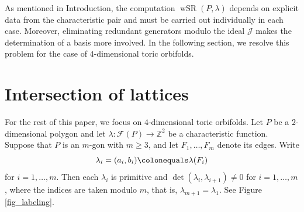 \documentclass[10pt]{amsart}
\theoremstyle{plain}
\theoremstyle{definition}
\numberwithin{equation}{section}
\newcommand{\ZZ}{\mathbb{Z}}
\DeclareMathOperator{\wSR}{wSR}
\begin{document}
As mentioned in Introduction, the computation $\wSR(P, \lambda)$ depends on explicit data from the characteristic pair and must be carried out individually in each case. Moreover, eliminating redundant generators modulo the ideal $\mathcal{J}$ makes the determination of a basis more involved. In the following section, we resolve this problem for the case of $4$-dimensional toric orbifolds. 






\section{Intersection of lattices}\label{sec_lat_int}
For the rest of this paper, we focus on $4$-dimensional toric orbifolds. Let $P$ be a $2$-dimensional polygon and let $\lambda\colon \mathcal{F}(P) \to \ZZ^2$ be a characteristic function. Suppose that $P$ is an $m$-gon with $m\geq 3$, and let $F_1, \dots, F_m$ denote its edges. Write
\[
\lambda_i=(a_i, b_i)\colonequals\lambda(F_i)
\] for $i=1, \dots, m$. Then each $\lambda_i$ is primitive and $\det(\lambda_i,\lambda_{i+1})\neq 0$ for $i=1, \dots, m$, where the indices are taken modulo $m$, that is, $\lambda_{m+1}=\lambda_1$. See Figure \ref{fig_labeling}. 
\end{document}
